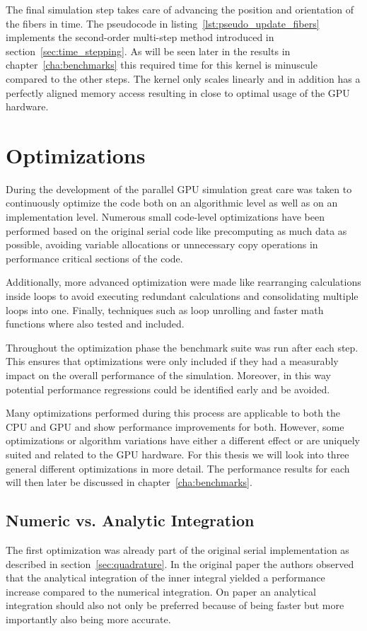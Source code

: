 \documentclass[a4paper,11pt]{kth-mag}
\begin{document}
The final simulation step takes care of advancing the position and orientation of the fibers in time. The pseudocode in listing~\ref{lst:pseudo_update_fibers} implements the second-order multi-step method introduced in section~\ref{sec:time_stepping}. As will be seen later in the results in chapter~\ref{cha:benchmarks} this required time for this kernel is minuscule compared to the other steps. The kernel only scales linearly and in addition has a perfectly aligned memory access resulting in close to optimal usage of the GPU hardware.

\section{Optimizations}
\label{sec:optimizations}

During the development of the parallel GPU simulation great care was taken to continuously optimize the code both on an algorithmic level as well as on an implementation level. Numerous small code-level optimizations have been performed based on the original serial code like precomputing as much data as possible, avoiding variable allocations or unnecessary copy operations in performance critical sections of the code.

Additionally, more advanced optimization were made like rearranging calculations inside loops to avoid executing redundant calculations and consolidating multiple loops into one. Finally, techniques such as loop unrolling and faster math functions where also tested and included.

Throughout the optimization phase the benchmark suite was run after each step. This ensures that optimizations were only included if they had a measurably impact on the overall performance of the simulation. Moreover, in this way potential performance regressions could be identified early and be avoided.

Many optimizations performed during this process are applicable to both the CPU and GPU and show performance improvements for both. However, some optimizations or algorithm variations have either a different effect or are uniquely suited and related to the GPU hardware. For this thesis we will look into three general different optimizations in more detail. The performance results for each will then later be discussed in chapter~\ref{cha:benchmarks}.

\subsection{Numeric vs. Analytic Integration}
\label{subsec:numeric_analytic}
The first optimization was already part of the original serial implementation as described in section~\ref{sec:quadrature}. In the original paper \cite{} the authors observed that the analytical integration of the inner integral yielded a performance increase compared to the numerical integration. On paper an analytical integration should also not only be preferred because of being faster but more importantly also being more accurate.
\end{document}
